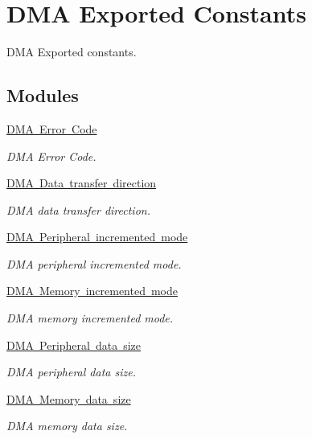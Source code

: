 \hypertarget{group___d_m_a___exported___constants}{}\section{D\+MA Exported Constants}
\label{group___d_m_a___exported___constants}


D\+MA Exported constants.  


\subsection*{Modules}
\begin{DoxyCompactItemize}
\item 
\mbox{\hyperlink{group___d_m_a___error___code}{D\+M\+A Error Code}}
\begin{DoxyCompactList}\small\item\em D\+MA Error Code. \end{DoxyCompactList}\item 
\mbox{\hyperlink{group___d_m_a___data__transfer__direction}{D\+M\+A Data transfer direction}}
\begin{DoxyCompactList}\small\item\em D\+MA data transfer direction. \end{DoxyCompactList}\item 
\mbox{\hyperlink{group___d_m_a___peripheral__incremented__mode}{D\+M\+A Peripheral incremented mode}}
\begin{DoxyCompactList}\small\item\em D\+MA peripheral incremented mode. \end{DoxyCompactList}\item 
\mbox{\hyperlink{group___d_m_a___memory__incremented__mode}{D\+M\+A Memory incremented mode}}
\begin{DoxyCompactList}\small\item\em D\+MA memory incremented mode. \end{DoxyCompactList}\item 
\mbox{\hyperlink{group___d_m_a___peripheral__data__size}{D\+M\+A Peripheral data size}}
\begin{DoxyCompactList}\small\item\em D\+MA peripheral data size. \end{DoxyCompactList}\item 
\mbox{\hyperlink{group___d_m_a___memory__data__size}{D\+M\+A Memory data size}}
\begin{DoxyCompactList}\small\item\em D\+MA memory data size. \end{DoxyCompactList}\item 

\end{DoxyCompactItemize}
